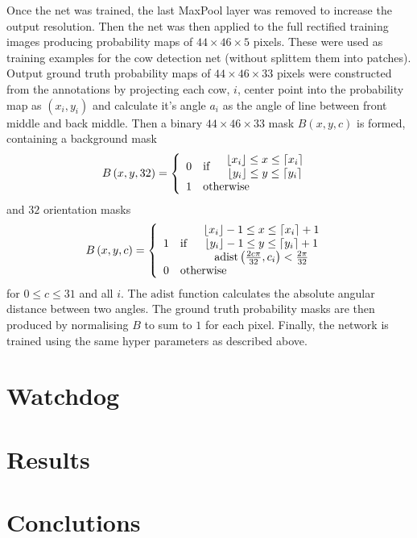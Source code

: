 \documentclass[10pt,a4paper,twocolumn]{article}
\begin{document}
Once the net was trained, the last MaxPool layer was removed to increase the output resolution. Then the net was then applied to the full rectified training images producing probability maps of $44\times 46\times 5$ pixels. These were used as training examples for the cow detection net (without splittem them into patches). Output ground truth probability maps of $44\times 46\times 33$ pixels were constructed from the annotations by projecting each cow, $i$, center point into the probability map as $\left( x_i, y_i \right)$ and calculate it's angle $a_i$ as the angle of line between front middle and back middle. Then a binary $44\times 46\times 33$ mask $B\left( x, y, c \right)$ is formed, containing a background mask
\begin{equation}
B\left( x, y, 32 \right) = \left\lbrace 
\begin{array}{clc}
0 & \text{if} & 
\begin{array}{c}
 \lfloor x_i \rfloor \leq x \leq \lceil x_i \rceil \\ 
 \lfloor y_i \rfloor \leq y \leq \lceil y_i \rceil
\end{array} 
\\ 
1 & \multicolumn{2}{l}{\text{otherwise}} 
\end{array} 
\right. 
\end{equation}
and $32$ orientation masks
\begin{equation}
B\left( x, y, c \right) = \left\lbrace 
\begin{array}{clc}
1 & \text{if} & 
\begin{array}{c}
 \lfloor x_i \rfloor-1 \leq x \leq \lceil x_i \rceil+1 \\ 
 \lfloor y_i \rfloor-1 \leq y \leq \lceil y_i \rceil+1 \\
 \mathrm{adist}\left(\frac{2c\pi}{32}, c_i\right) < \frac{2\pi}{32} \\
\end{array} 
\\ 
0 & \multicolumn{2}{l}{\text{otherwise}} 
\end{array} 
\right. 
\end{equation}
for $0\leq c \leq 31$ and all $i$. The $\mathrm{adist}$ function calculates the absolute angular distance between two angles. The ground truth probability masks are then produced by normalising $B$ to sum to $1$ for each pixel. Finally, the network is trained using the same hyper parameters as described above.

\section{Watchdog}

\section{Results}

\section{Conclutions}



\end{document}
